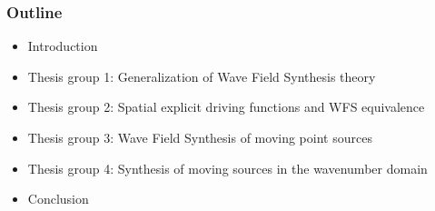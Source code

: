\documentclass{beamer}
\begin{document}
\begin{frame}
\frametitle{Outline}
\begin{itemize}
	\item Introduction \vspace{3mm}
	\item Thesis group 1: Generalization of Wave Field Synthesis theory \vspace{3mm}
	\item {\color{blue} Thesis group 2: Spatial explicit driving functions and WFS equivalence} \vspace{3mm}
	\item Thesis group 3: Wave Field Synthesis of moving point sources \vspace{3mm}
	\item Thesis group 4: Synthesis of moving sources in the wavenumber domain \vspace{3mm}
	\item Conclusion
\end{itemize}
\end{frame}
\end{document}
